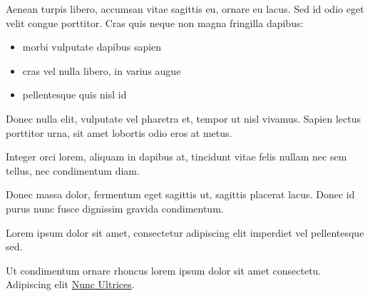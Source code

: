 \documentclass[10pt]{article}\usepackage[]{graphicx}\usepackage[]{color}
\begin{document}
\begin{minipage}[t]{.66\linewidth}
\hypertarget{secondnews}{} %

Aenean turpis libero, accumsan vitae sagittis eu, ornare eu lacus. Sed id odio eget velit congue porttitor. Cras quis neque non magna fringilla dapibus:

\begin{itemize}
\item morbi vulputate dapibus sapien
\item cras vel nulla libero, in varius augue
\item pellentesque quis nisl id 
\end{itemize}

Donec nulla elit, vulputate vel pharetra et, tempor ut nisl vivamus. Sapien lectus porttitor urna, sit amet lobortis odio eros at metus.

Integer orci lorem, aliquam in dapibus at, tincidunt vitae felis nullam nec sem tellus, nec condimentum diam.

Donec massa dolor, fermentum eget sagittis ut, sagittis placerat lacus. Donec id purus nunc fusce dignissim gravida condimentum. 

Lorem ipsum dolor sit amet, consectetur adipiscing elit imperdiet vel pellentesque sed.

Ut condimentum ornare rhoncus lorem ipsum dolor sit amet consectetu. Adipiscing elit \href{http://www.example.com}{Nunc Ultrices}.

\end{minipage} %

\end{document}
